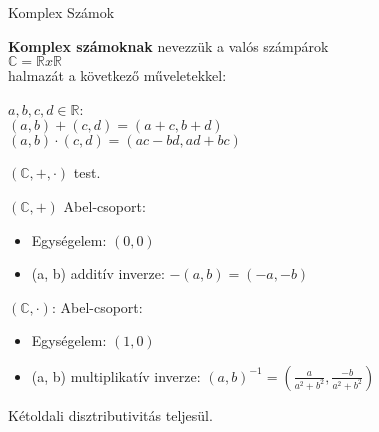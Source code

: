 \begin{frame}
\begin{tcolorbox}
{\Huge Komplex Számok}
\end{tcolorbox}
\end{frame}

\begin{frame}
\begin{tcolorbox}[title={Def.: Komplex számok}]
  \textbf{Komplex számoknak} nevezzük a valós számpárok\\
  $\mathbb{C} = \mathbb{R} x \mathbb{R}$\\
  halmazát a következő műveletekkel:\\
  \mmedskip

  $a, b, c, d \in \mathbb{R}$:\\
  $(a, b) + (c, d) = (a + c, b + d)$\\
  $(a, b) \cdot (c, d) = (ac - bd, ad + bc)$
\end{tcolorbox}

\begin{tcolorbox}[title={Ész}]
  $(\mathbb{C}, +, {\cdot})$ test.\\
  \mmedskip

  $(\mathbb{C}, +)$ Abel-csoport:\\
  \begin{itemize}
    \item Egységelem: $(0, 0)$
    \item (a, b) additív inverze: $-(a, b) = (-a, -b)$
  \end{itemize}
  \mmedskip

  $(\mathbb{C}, {\cdot})$: Abel-csoport:\\
  \begin{itemize}
    \item Egységelem: $(1, 0)$
    \item (a, b) multiplikatív inverze: $(a, b)^{-1} = (\frac{a}{a^2 + b^2}, \frac{-b}{a^2 + b^2})$
  \end{itemize}
  \mmedskip

  Kétoldali disztributivitás teljesül.
\end{tcolorbox}
\end{frame}

